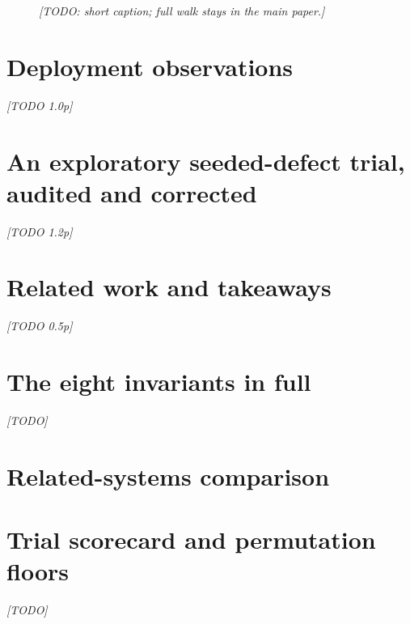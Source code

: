 \documentclass[10pt]{article}
\begin{document}
\begin{figure}[t]
\centering
\resizebox{\textwidth}{!}{}
\caption{\emph{[TODO: short caption; full walk stays in the main paper.]}}
\label{fig:arch}
\end{figure}

\section{Deployment observations}
\emph{[TODO 1.0p]}

\section{An exploratory seeded-defect trial, audited and corrected}
\emph{[TODO 1.2p]}

\section{Related work and takeaways}
\emph{[TODO 0.5p]}



\appendix
\section{The eight invariants in full}
\emph{[TODO]}
\section{Related-systems comparison}
\begin{center}\footnotesize\setlength{\tabcolsep}{3.5pt}

\end{center}
\section{Trial scorecard and permutation floors}
\emph{[TODO]}
\end{document}
